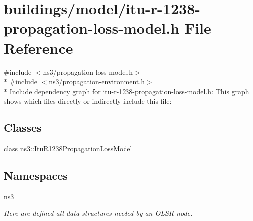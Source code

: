 \hypertarget{itu-r-1238-propagation-loss-model_8h}{}\section{buildings/model/itu-\/r-\/1238-\/propagation-\/loss-\/model.h File Reference}
\label{itu-r-1238-propagation-loss-model_8h}
{\ttfamily \#include $<$ns3/propagation-\/loss-\/model.\+h$>$}\\*
{\ttfamily \#include $<$ns3/propagation-\/environment.\+h$>$}\\*
Include dependency graph for itu-\/r-\/1238-\/propagation-\/loss-\/model.h\+:
This graph shows which files directly or indirectly include this file\+:
\subsection*{Classes}
\begin{DoxyCompactItemize}
\item 
class \hyperlink{classns3_1_1ItuR1238PropagationLossModel}{ns3\+::\+Itu\+R1238\+Propagation\+Loss\+Model}
\end{DoxyCompactItemize}
\subsection*{Namespaces}
\begin{DoxyCompactItemize}
\item 
 \hyperlink{namespacens3}{ns3}
\begin{DoxyCompactList}\small\item\em Here are defined all data structures needed by an O\+L\+SR node. \end{DoxyCompactList}\end{DoxyCompactItemize}

